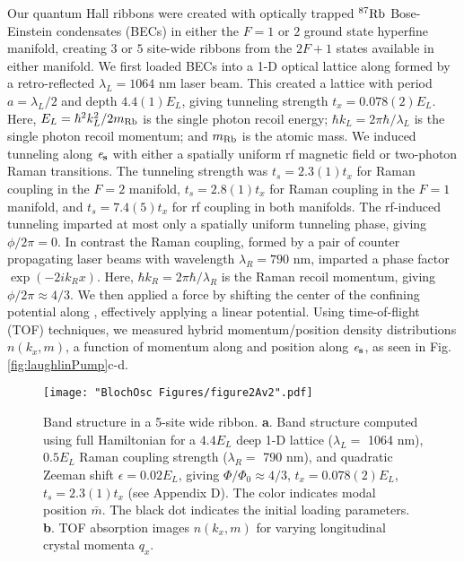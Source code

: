 	Our quantum Hall ribbons were created with optically trapped $^{87}\rm{Rb}$ Bose-Einstein condensates (BECs) in either the $F=1$ or $2$ ground state hyperfine manifold, creating $3$ or $5$  site-wide ribbons from the $2F+1$ states available in either manifold. We first loaded BECs into a 1-D optical lattice along \ex formed by a retro-reflected $\lambda_L=1064$ nm laser beam. This created a lattice with period $a=\lambda_L/2$ and depth $4.4(1) E_L$, giving tunneling strength $t_x = 0.078(2) E_L$. Here, $E_L=\hbar^2 k_L^2/2m_{\rm{Rb}}$ is the single photon recoil energy; $\hbar k_L=2\pi\hbar/\lambda_L$ is the single photon recoil momentum; and $m_{\rm{Rb}}$ is the atomic mass. We induced tunneling along $\bf{\mathit{e}_s}$ with either a spatially uniform rf magnetic field or two-photon Raman transitions. The tunneling strength was $t_s = 2.3(1) t_x$ for Raman coupling in the $F=2$ manifold, $t_s = 2.8(1) t_x$ for Raman coupling in the $F=1$ manifold, and $t_s = 7.4(5) t_x$ for rf coupling in both manifolds. The rf-induced tunneling imparted at most only a spatially uniform tunneling phase, giving $\phi/2\pi = 0$. In contrast the Raman coupling, formed by a pair of counter propagating laser beams with wavelength $\lambda_R=790$ nm, imparted a phase factor $\exp{(-2ik_Rx)}$. Here, $\hbar k_R=2\pi\hbar/\lambda_R$ is the Raman recoil momentum, giving $\phi/2\pi\approx4/3$. We then applied a force by shifting the center of the confining potential along \ex, effectively applying a linear potential. Using time-of-flight (TOF) techniques\cite{Stuhl2015}, we measured hybrid momentum/position density distributions $n(k_x,m)$, a function of momentum along \ex and position along $\bf{\mathit{e}_s}$, as seen in Fig. \ref{fig:laughlinPump}c-d. 
	
\begin{figure}
\texttt{[image: "BlochOsc Figures/figure2Av2".pdf]}
\caption{Band structure in a 5-site wide ribbon.  \textbf{a}. Band structure computed using full Hamiltonian for a $4.4 E_L$ deep 1-D lattice ($\lambda_L=$ 1064 nm), $0.5 E_L$ Raman coupling strength ($\lambda_R = $ 790 nm), and quadratic Zeeman shift $\epsilon=0.02 E_L$, giving $\Phi/\Phi_0 \approx 4/3$, $t_x = 0.078(2) E_L$, $t_s=2.3(1) t_x$ (see Appendix D). The color indicates modal position $\bar{m}$. The black dot indicates the initial loading parameters.  \textbf{b}. TOF absorption images $n(k_x,m)$ for varying longitudinal crystal momenta $q_x$.  }
\label{fig:bandStructure}
\end{figure}

